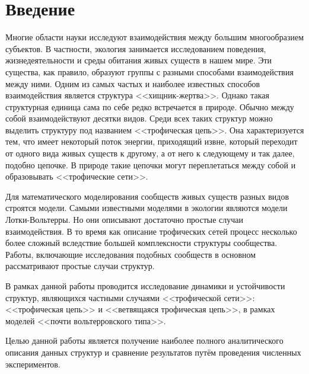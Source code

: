 \section{Введение}
Многие области науки исследуют взаимодействия между большим многообразием субъектов. В частности, экология занимается исследованием поведения, жизнедеятельности и среды обитания живых существ в нашем мире. Эти существа, как правило, образуют группы с разными способами взаимодействия между ними. Одним из самых частых и наиболее известных способов взаимодействия является структура <<хищник-жертва>>. Однако такая структурная единица сама по себе редко встречается в природе. Обычно между собой взаимодействуют десятки видов. Среди всех таких структур можно выделить структуру под названием <<трофическая цепь>>. Она характеризуется тем, что имеет некоторый поток энергии, приходящий извне, который переходит от одного вида живых существ к другому, а от него к следующему и так далее, подобно цепочке. В природе такие цепочки могут переплетаться между собой и образовывать <<трофические сети>>.

Для математического моделирования сообществ живых существ разных видов строятся модели. Самыми известными моделями в экологии являются модели Лотки-Вольтерры. Но они описывают достаточно простые случаи взаимодействия. В то время как описание трофических сетей процесс несколько более сложный вследствие большей комплексности структуры сообщества. Работы, включающие исследования подобных сообществ в основном рассматривают простые случаи структур. 

В рамках данной работы проводится исследование динамики и устойчивости структур, являющихся частными случаями <<трофической сети>>: <<трофическая цепь>> и <<ветвящаяся трофическая цепь>>, в рамках моделей <<почти вольтерровского типа>>.

Целью данной работы является получение наиболее полного аналитического описания данных структур и сравнение результатов путём проведения численных экспериментов.
